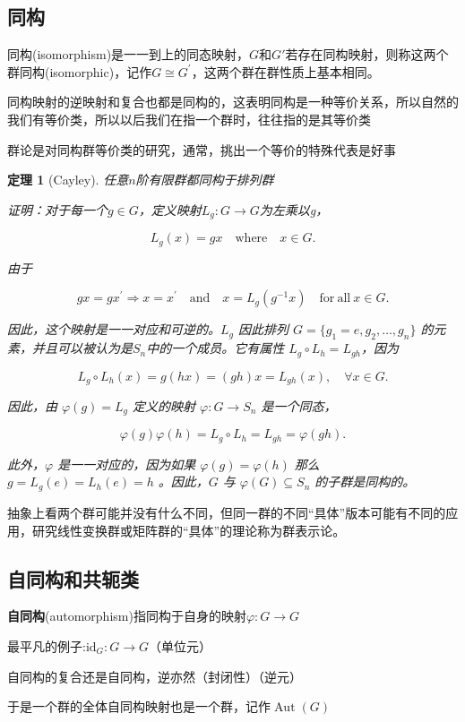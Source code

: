 \documentclass[hyperref,UTF8]{ctexbook}
\newtheorem{theorem}{定理}[chapter]
\begin{document}
\subsection{同构}
同构(isomorphism)是一一到上的同态映射，$G$和$G'$若存在同构映射，则称这两个群同构(isomorphic)，记作$G \cong G^{\prime}$，这两个群在群性质上基本相同。

同构映射的逆映射和复合也都是同构的，这表明同构是一种等价关系，所以自然的我们有等价类，所以以后我们在指一个群时，往往指的是其等价类

群论是对同构群等价类的研究，通常，挑出一个等价的特殊代表是好事
\begin{theorem}[Cayley]
    任意$n$阶有限群都同构于排列群

    证明：对于每一个$g\in G$，定义映射$L_{g} : G\to G$为左乘以g，

    $$
    L_{g}(x)=gx\quad\mathrm{where}\quad x\in G.
    $$
    
    由于
    
    $$
    gx=gx^{\prime}\Longrightarrow x=x^{\prime}\quad\mathrm{and}\quad x=L_{g}(g^{-1}x)\quad\mathrm{for~all~}x\in G.
    $$
    
    因此，这个映射是一一对应和可逆的。$L_g$ 因此排列 $G=\{g_1=e,g_2,\ldots,g_n\}$ 的元素，并且可以被认为是$S_n$中的一个成员。它有属性 $L_g\circ L_h=L_{gh}$，因为
    
    $$
    L_{g}\circ L_{h}(x)=g(hx)=(gh)x=L_{gh}(x),\quad\forall x\in G.
    $$
    
    因此，由 $\varphi(g)=L_g$ 定义的映射 $\varphi:G\to S_n$ 是一个同态，
    
    $$
    \varphi(g)\varphi(h)=L_{g}\circ L_{h}=L_{gh}=\varphi(gh).
    $$
    
    此外，$\varphi$ 是一一对应的，因为如果 $\varphi(g)=\varphi(h)$ 那么 $g=L_g(e)=L_h(e)=h$ 。因此，$G$ 与 $\varphi(G)\subseteq S_{n}$ 的子群是同构的。
\end{theorem}
抽象上看两个群可能并没有什么不同，但同一群的不同“具体”版本可能有不同的应用，研究线性变换群或矩阵群的“具体”的理论称为群表示论。
\subsection{自同构和共轭类}
\textbf{自同构}(automorphism)指同构于自身的映射$\varphi: G \rightarrow G$

最平凡的例子:$\mathrm{id}_{G}: G \rightarrow G$（单位元）

自同构的复合还是自同构，逆亦然（封闭性）（逆元）

于是一个群的全体自同构映射也是一个群，记作$\operatorname{Aut}(G)$
\end{document}
